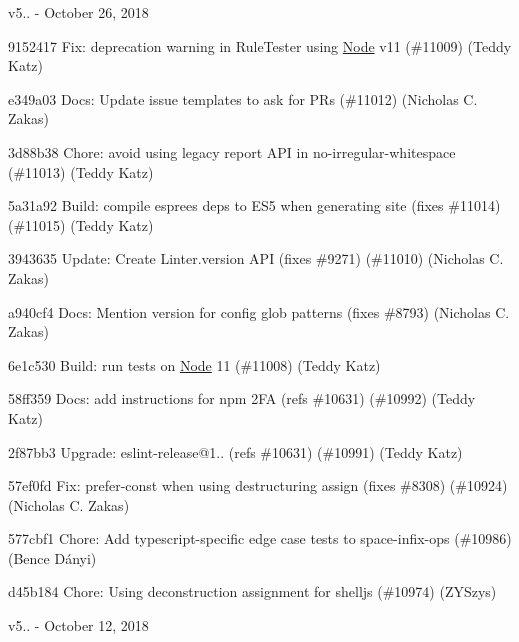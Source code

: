 v5.. -\/ October 26, 2018


\begin{DoxyItemize}
\item 9152417 Fix\+: deprecation warning in Rule\+Tester using \mbox{\hyperlink{class_node}{Node}} v11 (\#11009) (Teddy Katz)
\item e349a03 Docs\+: Update issue templates to ask for P\+Rs (\#11012) (Nicholas C. Zakas)
\item 3d88b38 Chore\+: avoid using legacy report A\+PI in no-\/irregular-\/whitespace (\#11013) (Teddy Katz)
\item 5a31a92 Build\+: compile espree\textquotesingle{}s deps to E\+S5 when generating site (fixes \#11014) (\#11015) (Teddy Katz)
\item 3943635 Update\+: Create Linter.\+version A\+PI (fixes \#9271) (\#11010) (Nicholas C. Zakas)
\item a940cf4 Docs\+: Mention version for config glob patterns (fixes \#8793) (Nicholas C. Zakas)
\item 6e1c530 Build\+: run tests on \mbox{\hyperlink{class_node}{Node}} 11 (\#11008) (Teddy Katz)
\item 58ff359 Docs\+: add instructions for npm 2FA (refs \#10631) (\#10992) (Teddy Katz)
\item 2f87bb3 Upgrade\+: eslint-\/release@1.. (refs \#10631) (\#10991) (Teddy Katz)
\item 57ef0fd Fix\+: prefer-\/const when using destructuring assign (fixes \#8308) (\#10924) (Nicholas C. Zakas)
\item 577cbf1 Chore\+: Add typescript-\/specific edge case tests to space-\/infix-\/ops (\#10986) (Bence Dányi)
\item d45b184 Chore\+: Using deconstruction assignment for shelljs (\#10974) (Z\+Y\+Szys)
\end{DoxyItemize}

v5.. -\/ October 12, 2018


